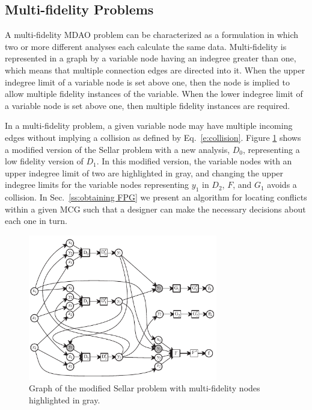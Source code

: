 \subsection{Multi-fidelity Problems}
  \label{ss:multi-fideliy problems}
  A multi-fidelity MDAO problem can be characterized as a formulation in which 
  two or more different analyses each calculate the same data. Multi-fidelity 
  is represented in a graph by a variable node having an indegree greater than 
  one, which means that multiple connection edges are directed into it. When the 
  upper indegree limit of a variable node is set above one, then the node is 
  implied to allow multiple fidelity instances of the variable. When the lower 
  indegree limit of a variable node is set above one, then multiple fidelity instances are required.

  In a multi-fidelity problem, a given variable node may have multiple incoming 
  edges without implying a collision as defined by Eq.~\ref{e:collision}. 
  Figure \ref{f:collision_example} shows a modified version of the Sellar problem 
  with a new analysis, $D_0$, representing a low fidelity version of $D_1$. 
  In this modified version, the variable nodes with an upper indegree limit of two 
  are highlighted in gray, and changing the upper indegree limits for the variable nodes 
  representing $y_1$ in $D_2$, $F$, and $G_1$ avoids a collision. In Sec.~\ref{ss:obtaining FPG} 
  we present an algorithm for locating conflicts within a given MCG such that a designer 
  can make the necessary decisions about each one in turn. 
  \begin{figure}
    \begin{center}
      \includegraphics[width=3.25in]{images/sellar_mulfi}
    \caption{Graph of the modified Sellar problem with multi-fidelity nodes highlighted in gray.\label{f:collision_example}}
  \end{center}
  \end{figure}

